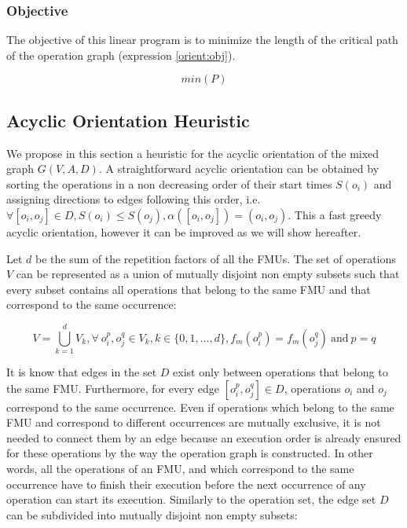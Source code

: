 \subsubsection{Objective}

The objective of this linear program is to minimize the length of the critical path of the operation graph (expression \ref{orient:obj}).

\begin{equation}
min(P)
\label{orient:obj}
\end{equation}


\subsection{Acyclic Orientation Heuristic}

We propose in this section a heuristic for the acyclic orientation of the mixed graph $G(V,A,D)$. A straightforward acyclic orientation can be obtained by sorting the operations in a non decreasing order of their start times $S(o_i)$ and assigning directions to edges following this order, i.e. $\forall [o_i,o_j] \in D, S(o_i) \leq S(o_j), \alpha([o_i,o_j]) = (o_i,o_j)$. This a fast greedy acyclic orientation, however it can be improved as we will show hereafter.

Let $d$ be the sum of the repetition factors of all the FMUs. The set of operations $V$ can be represented as a union of mutually disjoint non empty subsets such that every subset contains all operations that belong to the same FMU and that correspond to the same occurrence:

\begin{equation}
V = \bigcup_{k=1}^d V_k, \forall\ o_i^p, o_j^q \in V_k, k \in \{0, 1, \ldots, d\}, f_m(o_i^p)=f_m(o_j^q)\ \text{and}\ p = q
\label{eq:opsubset}
\end{equation}

It is know that edges in the set $D$ exist only between operations that belong to the same FMU. Furthermore, for every edge $[o_i^p,o_j^q] \in D$, operations $o_i$ and $o_j$ correspond to the same occurrence. Even if operations which belong to the same FMU and correspond to different occurrences are mutually exclusive, it is not needed to connect them by an edge because an execution order is already ensured for these operations by the way the operation graph is constructed. In other words, all the operations of an FMU, and which correspond to the same occurrence have to finish their execution before the next occurrence of any operation can start its execution. Similarly to the operation set, the edge set $D$ can be subdivided into mutually disjoint non empty subsets:

